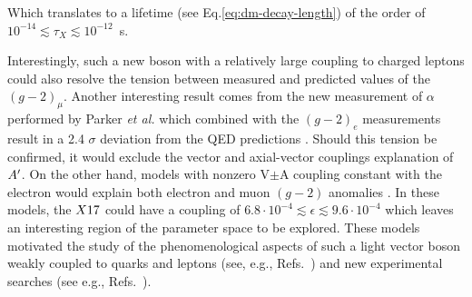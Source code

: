 Which translates to a lifetime (see Eq.\ref{eq:dm-decay-length}) of the order of $10^{-14}\lesssim \tau_X \lesssim 10^{-12}$~s.

Interestingly, such a new boson with a relatively large coupling to charged leptons could also resolve the tension between measured and predicted values of the $(g - 2)_{\mu}$. Another interesting result comes from the new measurement of $\alpha$ performed by Parker \textit{et al.} \cite{Parker191} which combined with the $(g-2)_e$ measurements result in a 2.4 $\sigma$ deviation from the QED predictions \cite{PhysRevLett.100.120801}. Should this tension be confirmed, it would exclude the vector and axial-vector couplings explanation of $A'$. On the other hand, models with nonzero V$\pm$A coupling constant with the electron would explain both electron and muon $(g - 2)$ anomalies \cite{Krasnikov:2019dgh}. In these models, the $X17$ could have a coupling of $6.8\cdot 10^{-4} \lesssim \epsilon \lesssim 9.6 \cdot 10^{-4}$ which leaves an interesting region of the parameter space to be explored. These models motivated the study of the phenomenological aspects of such a light vector boson weakly coupled to quarks and leptons (see, e.g., Refs.~\cite{fayet1, fayet2, fayet3, fayet4,jk, cheng, Zhang:2017zap, ia, liang, bart}) and new experimental searches (see e.g., Refs.~\cite{battaglieri2017cosmic, nardi}).



